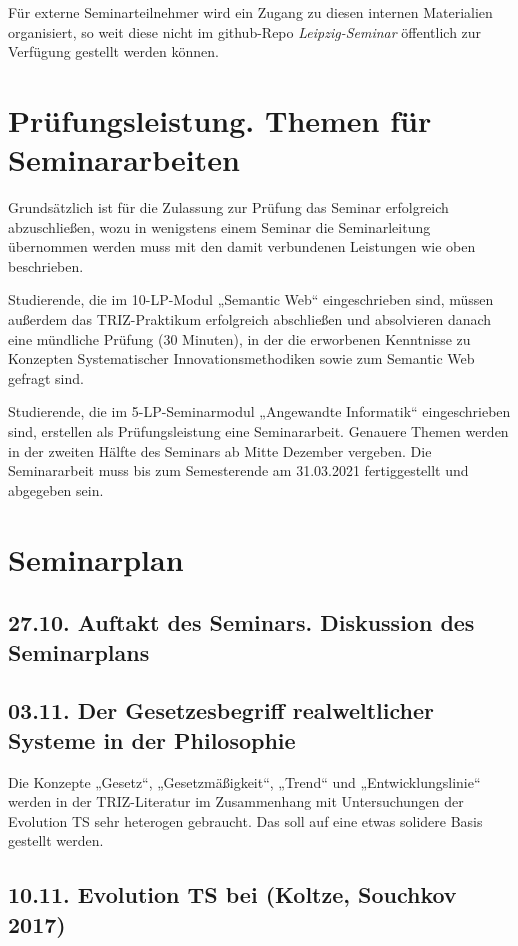 \documentclass[11pt,a4paper]{article}
\begin{document}
Für externe Seminarteilnehmer wird ein Zugang zu diesen internen Materialien
organisiert, so weit diese nicht im github-Repo \emph{Leipzig-Seminar}
öffentlich zur Verfügung gestellt werden können.

\section{Prüfungsleistung. Themen für Seminararbeiten}

Grundsätzlich ist für die Zulassung zur Prüfung das Seminar erfolgreich
abzuschließen, wozu in wenigstens einem Seminar die Seminarleitung übernommen
werden muss mit den damit verbundenen Leistungen wie oben beschrieben.

Studierende, die im 10-LP-Modul „Semantic Web“ eingeschrieben sind, müssen
außerdem das TRIZ-Praktikum erfolgreich abschließen und absolvieren danach
eine mündliche Prüfung (30 Minuten), in der die erworbenen Kenntnisse zu
Konzepten Systematischer Innovationsmethodiken sowie zum Semantic Web gefragt
sind.

Studierende, die im 5-LP-Seminarmodul „Angewandte Informatik“ eingeschrieben
sind, erstellen als Prüfungsleistung eine Seminararbeit. Genauere Themen
werden in der zweiten Hälfte des Seminars ab Mitte Dezember vergeben. Die
Seminararbeit muss bis zum Semesterende am 31.03.2021 fertiggestellt und
abgegeben sein. 

\section{Seminarplan}

\subsection*{27.10. Auftakt des Seminars. Diskussion des Seminarplans}

\subsection*{03.11. Der Gesetzesbegriff realweltlicher Systeme in der
  Philosophie}

Die Konzepte „Gesetz“, „Gesetzmäßigkeit“, „Trend“ und „Entwicklungslinie“
werden in der TRIZ-Literatur im Zusammenhang mit Untersuchungen der Evolution
TS sehr heterogen gebraucht. Das soll auf eine etwas solidere Basis gestellt
werden. 

\subsection*{10.11. Evolution TS bei (Koltze, Souchkov 2017) } 
\end{document}

